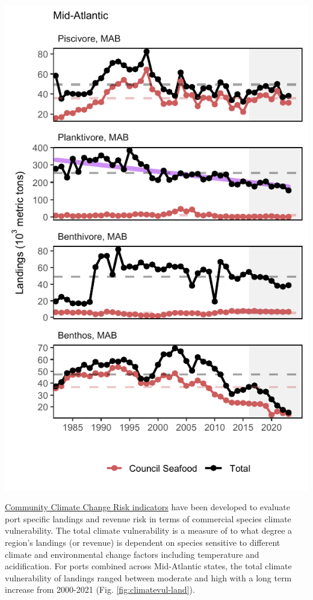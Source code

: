 \documentclass[
  10pt,
]{article}
\let\origfigure\figure
\let\endorigfigure\endfigure
\renewenvironment{figure}[1][2] {
    \expandafter\origfigure\expandafter[H]
} {
    \endorigfigure
}
\begin{document}
\begin{figure}

{\centering \includegraphics{midatlantic_files/figure-latex/comm-landings-1} 

}

\caption{Total commercial landings in the Mid-Atlantic Bight (black) and MAFMC-managed U.S seafood landings (red) by feeding guild, with significant declines (purple) in total planktivore landings.}\label{fig:comm-landings}
\end{figure}

\href{https://noaa-edab.github.io/catalog/community_climate_vulnerability.html}{Community Climate Change Risk indicators} have been developed to evaluate port specific landings and revenue risk in terms of commercial species climate vulnerability. The total climate vulnerability is a measure of to what degree a region's landings (or revenue) is dependent on species sensitive to different climate and environmental change factors including temperature and acidification. For ports combined across Mid-Atlantic states, the total climate vulnerability of landings ranged between moderate and high with a long term increase from 2000-2021 (Fig. \ref{fig:climatevul-land}).
\end{document}
